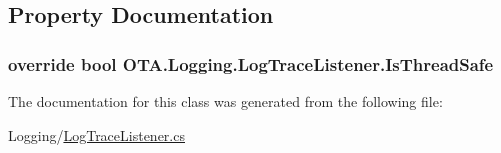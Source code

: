 \subsection{Property Documentation}
\hypertarget{class_o_t_a_1_1_logging_1_1_log_trace_listener_a3e5c85aff5d05b50104d6999c3e3ab57}{}
\subsubsection[{Is\+Thread\+Safe}]{\setlength{\rightskip}{0pt plus 5cm}override bool O\+T\+A.\+Logging.\+Log\+Trace\+Listener.\+Is\+Thread\+Safe\hspace{0.3cm}{\ttfamily [get]}}\label{class_o_t_a_1_1_logging_1_1_log_trace_listener_a3e5c85aff5d05b50104d6999c3e3ab57}


The documentation for this class was generated from the following file\+:\begin{DoxyCompactItemize}
\item 
Logging/\hyperlink{_log_trace_listener_8cs}{Log\+Trace\+Listener.\+cs}\end{DoxyCompactItemize}

